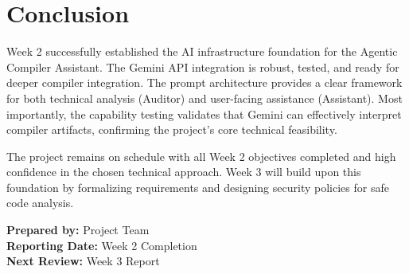 \documentclass[a4paper,11pt]{article}
\begin{document}
\section{Conclusion}

Week 2 successfully established the AI infrastructure foundation for the Agentic Compiler Assistant. The Gemini API integration is robust, tested, and ready for deeper compiler integration. The prompt architecture provides a clear framework for both technical analysis (Auditor) and user-facing assistance (Assistant). Most importantly, the capability testing validates that Gemini can effectively interpret compiler artifacts, confirming the project's core technical feasibility.

The project remains on schedule with all Week 2 objectives completed and high confidence in the chosen technical approach. Week 3 will build upon this foundation by formalizing requirements and designing security policies for safe code analysis.

\vspace{5mm}
\noindent\textbf{Prepared by:} Project Team \\
\textbf{Reporting Date:} Week 2 Completion \\
\textbf{Next Review:} Week 3 Report
\end{document}
